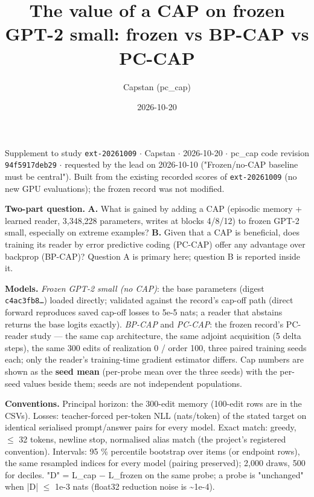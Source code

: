 \documentclass[10pt,a4paper]{article}
\title{The value of a CAP on frozen GPT-2 small: frozen vs BP-CAP vs PC-CAP}\author{Capstan (pc\_cap)}\date{2026-10-20}
\begin{document}
\maketitle\tableofcontents\clearpage


Supplement to study \texttt{ext-20261009} $\cdot$ Capstan $\cdot$ 2026-10-20 $\cdot$ pc\_cap code revision \texttt{94f5917deb29} $\cdot$ requested by the lead on 2026-10-10 ("Frozen/no-CAP baseline must be central"). Built from the existing recorded scores of \texttt{ext-20261009} (no new GPU evaluations); the frozen record was not modified.



\textbf{Two-part question.} \textbf{A.} What is gained by adding a CAP (episodic memory + learned reader, 3,348,228 parameters, writes at blocks 4/8/12) to frozen GPT-2 small, especially on extreme examples? \textbf{B.} Given that a CAP is beneficial, does training its reader by error predictive coding (PC-CAP) offer any advantage over backprop (BP-CAP)? Question A is primary here; question B is reported inside it.



\textbf{Models.} \emph{Frozen GPT-2 small (no CAP)}: the base parameters (digest \texttt{c4ac3fb8\ldots{}}) loaded directly; validated against the record's cap-off path (direct forward reproduces saved cap-off losses to 5e-5 nats; a reader that abstains returns the base logits exactly). \emph{BP-CAP} and \emph{PC-CAP}: the frozen record's PC-reader study — the same cap architecture, the same adjoint acquisition (5 delta steps), the same 300 edits of realization 0 / order 100, three paired training seeds each; only the reader's training-time gradient estimator differs. Cap numbers are shown as the \textbf{seed mean} (per-probe mean over the three seeds) with the per-seed values beside them; seeds are not independent populations.



\textbf{Conventions.} Principal horizon: the 300-edit memory (100-edit rows are in the CSVs). Losses: teacher-forced per-token NLL (nats/token) of the stated target on identical serialised prompt/answer pairs for every model. Exact match: greedy, $\le$ 32 tokens, newline stop, normalised alias match (the project's registered convention). Intervals: 95 \% percentile bootstrap over items (or endpoint rows), the same resampled indices for every model (pairing preserved); 2,000 draws, 500 for deciles. "D" = L\_cap $-$ L\_frozen on the same probe; a probe is "unchanged" when |D| $\le$ 1e-3 nats (float32 reduction noise is \textasciitilde{}1e-4).
\end{document}
